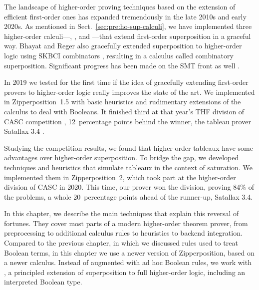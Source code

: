 
The landscape of higher-order proving techniques based on the extension of efficient
first-order ones has expanded tremendously in the late 2010s and early 2020s. As
mentioned in Sect.~\ref{sec:pre:ho-sup-calculi}, we have implemented three
higher-order calculi---\lfsup{}, \lsup{}, and \osup{}---that extend first-order superposition in a graceful way.
Bhayat and Reger also gracefully extended superposition to higher-order logic using
\textsf{SKBCI} combinators \cite{br-20-full-sup-w-combs}, resulting in a calculus called combinatory superposition. Significant progress has been
made on the SMT front as well \cite{brotb-19-ho-smt}.

In 2019 we tested for the first time if the idea of gracefully extending first-order provers to
higher-order logic really improves the state of the art. We
implemented \lsup{} \cite{bbtvw-21-sup-lam} in Zipperposition~1.5 with basic
heuristics and rudimentary extensions of the calculus to deal with Booleans. It
finished third at that year's THF division of CASC competition
\cite{gs-19-casc27}, 12~percentage points behind the winner, the tableau prover
Satallax 3.4 \cite{cb-12-satallax}.

Studying the competition results, we found that higher-order tableaux have some
advantages over higher-order superposition. To bridge the gap, we developed
techniques and heuristics that simulate tableaux in the context of saturation.
We implemented them in Zipperposition~2, which took part at the higher-order
division of CASC \cite{gs-21-cascj10} in 2020. This time, our prover won the
division, proving 84\% of the problems, a whole 20~percentage points ahead of
the runner-up, Satallax 3.4.

In this chapter, we describe the main techniques that explain this reversal of
fortunes. They cover most parts of a modern higher-order theorem prover, from
preprocessing to additional calculus rules to heuristics to backend integration.
Compared to the previous chapter, in which we discussed rules used to treat
Boolean terms, in this chapter we use a newer version of Zipperposition, based
on a newer calculus. Instead of \lsup{} augmented with ad hoc Boolean rules, we
work with {\osup} \cite{bbtv-21-full-ho-sup}, a principled extension of
superposition to full higher-order logic, including an interpreted Boolean type.

